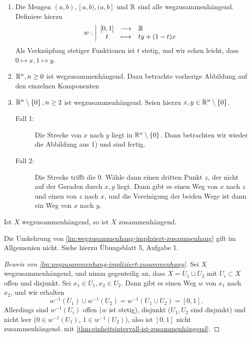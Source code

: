 \begin{example}
    \begin{enumerate}[1)]
        \item     Die Mengen $(a,b), [a,b), (a,b]$ und $\mathbb{R}$ sind alle wegzusammenhängend. Definiere hierzu
        \begin{equation*}
        w: \left| \begin{array}{c c l} 
            [0,1] & \longrightarrow & \mathbb{R} \\
            t & \longmapsto &  ty + (1-t)x
        \end{array} \right.
    \end{equation*}
   Als Verknüpfung stetiger Funktionen ist $t$ stetig, und wir sehen leicht, dass  $0 \mapsto x, 1 \mapsto y$. 
   \item $\mathbb{R}^n, n\geq 0$ ist wegzusammenhängend. Dazu betrachte vorherige Abbildung auf den einzelnen Komponenten
   \item $\mathbb{R}^n \setminus \left \{0\right\} , n\geq 2$ ist wegzusammenhängend. Seien hierzu $x,y\in \mathbb{R}^n \setminus \left \{0\right\}$.
       \begin{description}
           \item[Fall 1:] Die Strecke von $x$ nach  $y$ liegt in  $\mathbb{R}^n \setminus \left \{0\right\}$. Dann betrachten wir wieder die Abbildung aus 1) und sind fertig.
           \item[Fall 2:] Die Strecke trifft die $0$. Wähle dann einen dritten Punkt $z$, der nicht auf der Geraden durch $x,y$ liegt. Dann gibt es einen Weg von $x$ nach  $z$ und einen von  $z$ nach  $x$, und die Vereinigung der beiden Wege ist dann ein Weg von  $x$ nach  $y$.
       \end{description}
    \end{enumerate}
\end{example}

\begin{lemma}\label{lm:wegzusammenhang-impliziert-zusammenhang}
    Ist $X$ wegzusammenhängend, so ist  $X$ zusammenhängend.
\end{lemma}

\begin{warning}
    Die Umkehrung von \autoref{lm:wegzusammenhang-impliziert-zusammenhang} gilt im Allgemenien nicht. Siehe hierzu Übungsblatt 5, Aufgabe 1.
\end{warning}

\begin{proof}[Beweis von \autoref{lm:wegzusammenhang-impliziert-zusammenhang}]
    Sei $X$ wegzusammenhängend, und nimm gegenteilig an, dass  $X = U_1 \sqcup U_2$ mit $U_i \subset X$ offen und disjunkt. Sei $x_1 \in U_1, x_2\in U_2$. Dann gibt es einen Weg $w$ von  $x_1$ nach $x_2$, und  wir erhalten
    \[
        w^{-1}(U_1) \cup w^{-1}(U_2) = w^{-1}(U_1\cup U_2) = [0,1]
    .\] 
    Allerdings sind $w^{-1}(U_i)$ offen ($w$ ist stetig), disjunkt ($U_1,U_2$ sind disjunkt) und nicht leer ($0\in w^{-1}(U_1)$, $1\in w^{-1}(U_2)$), also ist $[0,1]$ nicht zusammenhängend. \contra mit \autoref{thm:einheitsintervall-ist-zusammenhängend}.
\end{proof}

